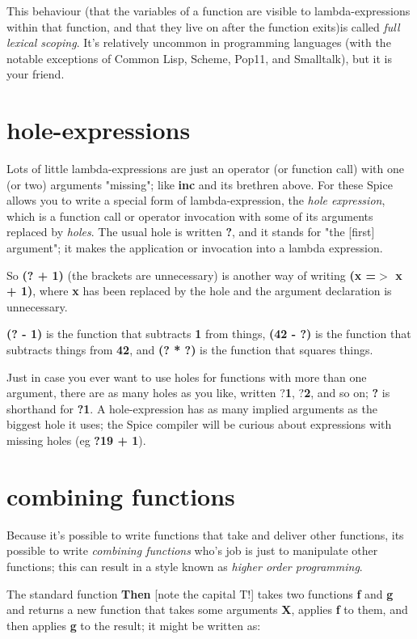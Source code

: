 \documentclass{report}
\begin{document}
This behaviour (that the variables of a function are visible to
lambda-expressions within that function, and that they live on after the
function exits)is called {\em full lexical scoping}. It's relatively uncommon
in programming languages (with the notable exceptions of Common Lisp, Scheme,
Pop11, and Smalltalk), but it is your friend.

\section{hole-expressions}


Lots of little lambda-expressions are just an operator (or function call)
with one (or two) arguments "missing"; like {\bf inc} and its brethren above.
For these Spice allows you to write a special form of lambda-expression, the
{\em hole expression}, which is a function call or operator invocation with
some of its arguments replaced by {\em holes}. The usual hole is written {\bf ?},
and it stands for "the {[}first{]} argument"; it makes the application or
invocation into a lambda expression.

So {\bf (? + 1)} (the brackets are unnecessary) is another way of writing {\bf (x =$>$
x + 1)}, where {\bf x} has been replaced by the hole and the argument declaration
is unnecessary.

{\bf (? - 1)} is the function that subtracts {\bf 1} from things, {\bf (42 - ?)} is
the function that subtracts things from {\bf 42}, and {\bf (? * ?)} is the
function that squares things.

Just in case you ever want to use holes for functions with more than one
argument, there are as many holes as you like, written ?{\bf 1}, ?{\bf 2}, and so
on; {\bf ?} is shorthand for {\bf ?1}. A hole-expression has as many implied
arguments as the biggest hole it uses; the Spice compiler will be curious
about expressions with missing holes (eg {\bf ?19 + 1}).

\section{combining functions}


Because it's possible to write functions that take and deliver other
functions, its possible to write {\em combining functions} who's job is just
to manipulate other functions; this can result in a style known as {\em higher
order programming}.

The standard function {\bf Then} {[}note the capital T!{]} takes two functions
{\bf f} and {\bf g} and returns a new function that takes some arguments {\bf X},
applies {\bf f} to them, and then applies {\bf g} to the result; it might be written
as:
\end{document}
